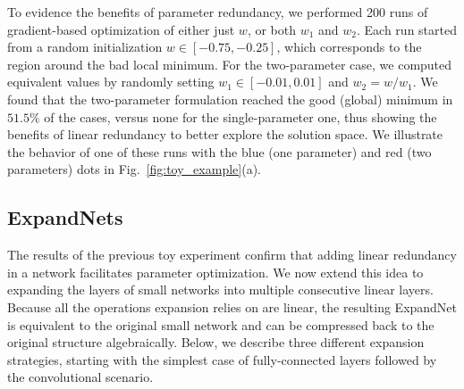 \documentclass[10pt,twocolumn,letterpaper]{article}
\begin{document}
To evidence the benefits of parameter redundancy, we performed 200 runs of gradient-based optimization of either just $w$, or both $w_1$ and $w_2$. Each run started from a random initialization $w\in[-0.75, -0.25]$, which corresponds to the region around the bad local minimum. For the two-parameter case, we computed equivalent values by randomly setting $w_1\in[-0.01, 0.01]$ and $w_2=w/w_1$. We found that
the two-parameter formulation reached the good (global) minimum in  $51.5\%$ of the cases, versus none for the single-parameter one, thus showing the benefits of linear redundancy to better explore the solution space. We illustrate the behavior of one of these runs with the blue (one parameter) and red (two parameters) dots in Fig.~\ref{fig:toy_example}(a). 

\subsection{ExpandNets}

The results of the previous toy experiment confirm that adding linear redundancy in a network facilitates parameter optimization. We now extend this idea to expanding the layers of small networks into multiple consecutive linear layers. Because all the operations expansion relies on are linear, the resulting ExpandNet is equivalent to the original small network and can be compressed back to the original structure algebraically. Below, we describe three different expansion strategies, starting with the simplest case of fully-connected layers followed by the convolutional scenario.
\end{document}

